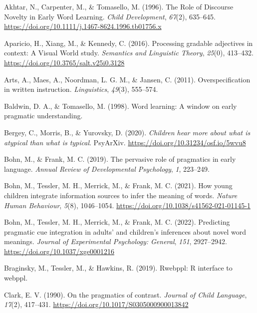 \documentclass[
  english,
  man,floatsintext]{apa6}
\newlength{\cslhangindent}
\newenvironment{cslreferences}%
  {\setlength{\parindent}{0pt}%
  \everypar{\setlength{\hangindent}{\cslhangindent}}\ignorespaces}%
  {\par}
\begin{document}
\hypertarget{refs}{}
\begin{cslreferences}
\leavevmode\hypertarget{ref-akhtar_role_1996}{}%
Akhtar, N., Carpenter, M., \& Tomasello, M. (1996). The Role of Discourse Novelty in Early Word Learning. \emph{Child Development}, \emph{67}(2), 635--645. \url{https://doi.org/10.1111/j.1467-8624.1996.tb01756.x}

\leavevmode\hypertarget{ref-aparicio_processing_2016}{}%
Aparicio, H., Xiang, M., \& Kennedy, C. (2016). Processing gradable adjectives in context: A Visual World study. \emph{Semantics and Linguistic Theory}, \emph{25}(0), 413--432. \url{https://doi.org/10.3765/salt.v25i0.3128}

\leavevmode\hypertarget{ref-arts_overspecification_2011}{}%
Arts, A., Maes, A., Noordman, L. G. M., \& Jansen, C. (2011). Overspecification in written instruction. \emph{Linguistics}, \emph{49}(3), 555--574.

\leavevmode\hypertarget{ref-baldwin1998word}{}%
Baldwin, D. A., \& Tomasello, M. (1998). Word learning: A window on early pragmatic understanding.

\leavevmode\hypertarget{ref-bergey_morris_2020}{}%
Bergey, C., Morris, B., \& Yurovsky, D. (2020). \emph{Children hear more about what is atypical than what is typical}. PsyArXiv. \url{https://doi.org/10.31234/osf.io/5wvu8}

\leavevmode\hypertarget{ref-bohn2019pervasive}{}%
Bohn, M., \& Frank, M. C. (2019). The pervasive role of pragmatics in early language. \emph{Annual Review of Developmental Psychology}, \emph{1}, 223--249.

\leavevmode\hypertarget{ref-bohn_how_2021}{}%
Bohn, M., Tessler, M. H., Merrick, M., \& Frank, M. C. (2021). How young children integrate information sources to infer the meaning of words. \emph{Nature Human Behaviour}, \emph{5}(8), 1046--1054. \url{https://doi.org/10.1038/s41562-021-01145-1}

\leavevmode\hypertarget{ref-bohn_predicting_2022}{}%
Bohn, M., Tessler, M. H., Merrick, M., \& Frank, M. C. (2022). Predicting pragmatic cue integration in adults' and children's inferences about novel word meanings. \emph{Journal of Experimental Psychology: General}, \emph{151}, 2927--2942. \url{https://doi.org/10.1037/xge0001216}

\leavevmode\hypertarget{ref-braginskyrwebppl}{}%
Braginsky, M., Tessler, M., \& Hawkins, R. (2019). Rwebppl: R interface to webppl.

\leavevmode\hypertarget{ref-clark_pragmatics_1990}{}%
Clark, E. V. (1990). On the pragmatics of contrast. \emph{Journal of Child Language}, \emph{17}(2), 417--431. \url{https://doi.org/10.1017/S0305000900013842}


\end{cslreferences}
\end{document}
